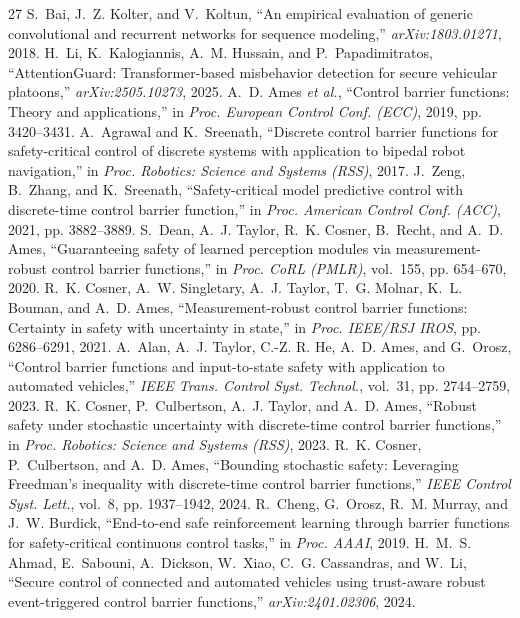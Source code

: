 \documentclass[journal]{IEEEtran}
\begin{document}
\begin{thebibliography}{27}
S.~Bai, J.~Z. Kolter, and V.~Koltun, ``An empirical evaluation of generic convolutional and recurrent networks for sequence modeling,'' \textit{arXiv:1803.01271}, 2018.
H.~Li, K.~Kalogiannis, A.~M. Hussain, and P.~Papadimitratos, ``AttentionGuard: Transformer-based misbehavior detection for secure vehicular platoons,'' \textit{arXiv:2505.10273}, 2025.
A.~D. Ames \textit{et al.}, ``Control barrier functions: Theory and applications,'' in \textit{Proc. European Control Conf. (ECC)}, 2019, pp. 3420--3431.
A.~Agrawal and K.~Sreenath, ``Discrete control barrier functions for safety-critical control of discrete systems with application to bipedal robot navigation,'' in \textit{Proc. Robotics: Science and Systems (RSS)}, 2017.
J.~Zeng, B.~Zhang, and K.~Sreenath, ``Safety-critical model predictive control with discrete-time control barrier function,'' in \textit{Proc. American Control Conf. (ACC)}, 2021, pp. 3882--3889.
S.~Dean, A.~J. Taylor, R.~K. Cosner, B.~Recht, and A.~D. Ames, ``Guaranteeing safety of learned perception modules via measurement-robust control barrier functions,'' in \textit{Proc. CoRL (PMLR)}, vol.~155, pp. 654--670, 2020.
R.~K. Cosner, A.~W. Singletary, A.~J. Taylor, T.~G. Molnar, K.~L. Bouman, and A.~D. Ames, ``Measurement-robust control barrier functions: Certainty in safety with uncertainty in state,'' in \textit{Proc. IEEE/RSJ IROS}, pp. 6286--6291, 2021.
A.~Alan, A.~J. Taylor, C.-Z. R. He, A.~D. Ames, and G.~Orosz, ``Control barrier functions and input-to-state safety with application to automated vehicles,'' \textit{IEEE Trans. Control Syst. Technol.}, vol.~31, pp. 2744--2759, 2023.
R.~K. Cosner, P.~Culbertson, A.~J. Taylor, and A.~D. Ames, ``Robust safety under stochastic uncertainty with discrete-time control barrier functions,'' in \textit{Proc. Robotics: Science and Systems (RSS)}, 2023.
R.~K. Cosner, P.~Culbertson, and A.~D. Ames, ``Bounding stochastic safety: Leveraging Freedman's inequality with discrete-time control barrier functions,'' \textit{IEEE Control Syst. Lett.}, vol.~8, pp. 1937--1942, 2024.
R.~Cheng, G.~Orosz, R.~M. Murray, and J.~W. Burdick, ``End-to-end safe reinforcement learning through barrier functions for safety-critical continuous control tasks,'' in \textit{Proc. AAAI}, 2019.
H.~M.~S. Ahmad, E.~Sabouni, A.~Dickson, W.~Xiao, C.~G. Cassandras, and W.~Li, ``Secure control of connected and automated vehicles using trust-aware robust event-triggered control barrier functions,'' \textit{arXiv:2401.02306}, 2024.

\end{thebibliography}
\end{document}
